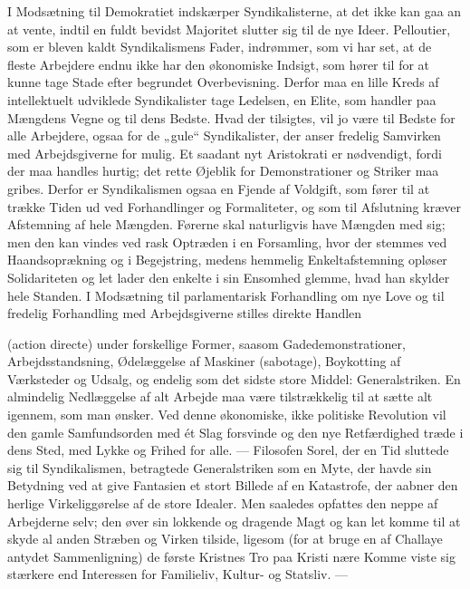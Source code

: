 \documentclass[12pt,a4paper,openany]{book}
\newcommand{\opage}[1]{\marginnote{\footnotesize\textit{[#1]}}}
\newcommand{\whiteline}{\par\vspace{\baselineskip}\par}
\begin{document}
I Modsætning til Demokratiet indskærper Syndikalisterne, at det
ikke kan gaa an at vente, indtil en fuldt bevidst Majoritet slutter
sig til de nye Ideer. Pelloutier, som er bleven kaldt Syndikalismens
Fader, indrømmer, som vi har set, at de fleste Arbejdere endnu
ikke har den økonomiske Indsigt, som hører til for at kunne tage
Stade efter begrundet Overbevisning. Derfor maa en lille Kreds af
intellektuelt udviklede Syndikalister tage Ledelsen, en Elite, som
handler paa Mængdens Vegne og til dens Bedste. Hvad der tilsigtes,
vil jo være til Bedste for alle Arbejdere, ogsaa for de „gule“ Syndikalister,
der anser fredelig Samvirken med Arbejdsgiverne for mulig.
Et saadant nyt Aristokrati er nødvendigt, fordi der maa handles
hurtig; det rette Øjeblik for Demonstrationer og Striker maa gribes.
Derfor er Syndikalismen ogsaa en Fjende af Voldgift, som fører til
at trække Tiden ud ved Forhandlinger og Formaliteter, og som til
Afslutning kræver Afstemning af hele Mængden. Førerne skal naturligvis
have Mængden med sig; men den kan vindes ved rask Optræden
i en Forsamling, hvor der stemmes ved Haandsoprækning og i
Begejstring, medens hemmelig Enkeltafstemning opløser Solidariteten
og let lader den enkelte i sin Ensomhed glemme, hvad han
skylder hele Standen.
I Modsætning til parlamentarisk Forhandling om nye Love og til
fredelig Forhandling med Arbejdsgiverne stilles direkte Handlen

\whiteline

\opage{100}(action directe) under forskellige Former, saasom Gadedemonstrationer,
Arbejdsstandsning, Ødelæggelse af Maskiner (sabotage), Boykotting
af Værksteder og Udsalg, og endelig som det sidste store
Middel: Generalstriken. En almindelig Nedlæggelse af alt Arbejde
maa være tilstrækkelig til at sætte alt igennem, som man ønsker.
Ved denne økonomiske, ikke politiske Revolution vil den gamle Samfundsorden
med ét Slag forsvinde og den nye Retfærdighed træde i
dens Sted, med Lykke og Frihed for alle. --- Filosofen Sorel, der en
Tid sluttede sig til Syndikalismen, betragtede Generalstriken som
en Myte, der havde sin Betydning ved at give Fantasien et stort Billede
af en Katastrofe, der aabner den herlige Virkeliggørelse af de
store Idealer. Men saaledes opfattes den neppe af Arbejderne selv;
den øver sin lokkende og dragende Magt og kan let komme til at
skyde al anden Stræben og Virken tilside, ligesom (for at bruge
en af Challaye antydet Sammenligning) de første Kristnes Tro paa
Kristi nære Komme viste sig stærkere end Interessen for Familieliv,
Kultur- og Statsliv. ---
\end{document}
